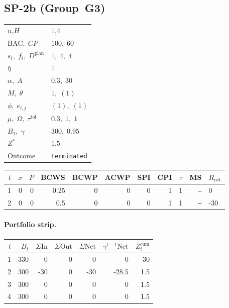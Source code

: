 \documentclass[12pt, a4paper]{article}
\newcommand{\BAC}{\mathrm{BAC}}
\begin{document}
\newpage

\subsection*{SP-2b  (Group~G3)}
\begin{center}
\begin{tabular}{ll}
\toprule
$n$,\;$H$ & $1$,\;$4$ \\
$\BAC,\;CP$ & $100,\;60$ \\
$s_i,\;f_i,\;D^{\mathrm{plan}}$ & $1,\;4,\;4$ \\
$\bar\eta$ & $1$ \\
$\alpha,\;A$ & $0.3,\;30$ \\
$M,\;\theta$ & $1,\;(1)$ \\
$\phi,\;e_{i,j}$ & $(1),\;(1)$ \\
$\mu,\;\Omega,\;\tau^{\mathrm{tol}}$ & $0.3,\;1,\;1$ \\
$B_1,\;\gamma$ & $300,\;0.95$ \\
$Z^*$ & $1.5$ \\
Outcome & \texttt{terminated} \\
\bottomrule
\end{tabular}
\end{center}

\begin{center}
\begin{tabular}{rrrrrrrrrrl}
\toprule
$t$ & $x$ & $P$ & BCWS & BCWP & ACWP & SPI & CPI & $\tau$ & MS & $R_{\mathrm{net}}$\\
\midrule
1 & 0 & 0 & 0.25 & 0 & 0 & 0 & 1 & 1 & \texttt{---} & 0 \\
2 & 0 & 0 & 0.5 & 0 & 0 & 0 & 1 & 1 & \texttt{---} & -30 \\
\bottomrule
\end{tabular}
\end{center}
\paragraph{Portfolio strip.}
\begin{center}
\begin{tabular}{rrrrrrr}
\toprule
$t$ & $B_t$ & $\Sigma\mathrm{In}$ & $\Sigma\mathrm{Out}$ & $\Sigma\mathrm{Net}$ & $\gamma^{t-1}\mathrm{Net}$ & $Z_t^{\mathrm{cum}}$\\
\midrule
1 & 330 & 0 & 0 & 0 & 0 & 30 \\
2 & 300 & -30 & 0 & -30 & -28.5 & 1.5 \\
3 & 300 & 0 & 0 & 0 & 0 & 1.5 \\
4 & 300 & 0 & 0 & 0 & 0 & 1.5 \\
\bottomrule
\end{tabular}
\end{center}
\end{document}

